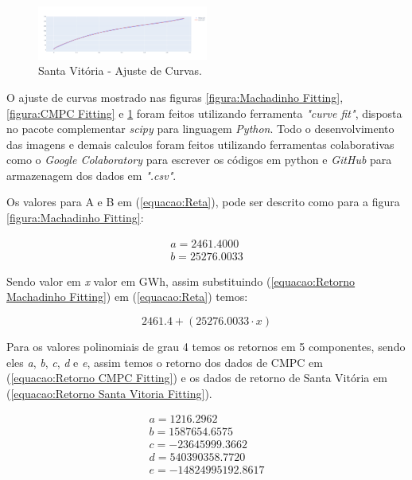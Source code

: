 \documentclass[conference]{IEEEtran}
\begin{document}
\begin{figure}[h]
\includegraphics[width=0.5\textwidth]{Figuras/FITTING_SANTA_VITORIA_SEM_ZERO.png}
\centering
\caption{Santa Vitória - Ajuste de Curvas.}
\label{figura:Santa Vitoria Fitting}
\end{figure}

O ajuste de curvas mostrado nas figuras \ref{figura:Machadinho Fitting}, \ref{figura:CMPC Fitting} e \ref{figura:Santa Vitoria Fitting} foram feitos utilizando ferramenta \textit{"curve fit"}, disposta no pacote complementar \textit{scipy} para linguagem \textit{Python}. Todo o desenvolvimento das imagens e demais calculos foram feitos utilizando ferramentas colaborativas como o \textit{Google Colaboratory} para escrever os códigos em python e \textit{GitHub} para armazenagem dos dados em \textit{".csv"}.

Os valores para A e B em (\ref{equacao:Reta}), pode ser descrito como para a figura \ref{figura:Machadinho Fitting}:

\begin{equation}
\begin{split}
\label{equacao:Retorno Machadinho Fitting}
    a= 2461.4000\\
    b= 25276.0033
\end{split}
\end{equation}

Sendo valor em \textit{x} valor em GWh, assim substituindo (\ref{equacao:Retorno Machadinho Fitting}) em (\ref{equacao:Reta}) temos:

\begin{equation}
\label{equacao:Valor Machadinho Reta}
2461.4 + (25276.0033 \cdot x)
\end{equation}

Para os valores polinomiais de grau 4 temos os retornos em 5 componentes, sendo eles \textit{a}, \textit{b}, \textit{c}, \textit{d} e \textit{e}, assim temos o retorno dos dados de CMPC em (\ref{equacao:Retorno CMPC Fitting}) e os dados de retorno de Santa Vitória em (\ref{equacao:Retorno Santa Vitoria Fitting}).

\begin{equation}
\begin{split}
\label{equacao:Retorno CMPC Fitting}
a = 1216.2962\\
b = 1587654.6575\\
c = -23645999.3662\\
d = 540390358.7720\\
e = -14824995192.8617
\end{split}
\end{equation}
\end{document}
